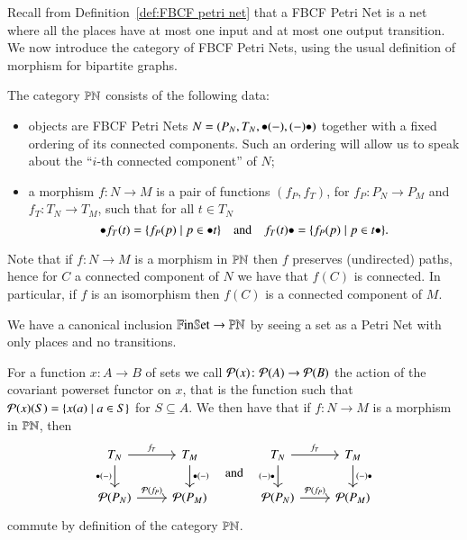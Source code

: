 Recall from Definition~\ref{def:FBCF petri net} that a FBCF Petri Net is a net where all the places have at most one input and at most one output transition. We now introduce the category of FBCF Petri Nets, using the usual definition of morphism for bipartite graphs.

\begin{definition}
    The category $\mathbb{PN}$ consists of the following data:
    \begin{itemize}
        \item objects are FBCF Petri Nets $N=(P_N,T_N,\inp{},\out{})$ together with a fixed ordering of its connected components. Such an ordering will allow us to speak about the ``$i$-th connected component'' of $N$;%
        \item a morphism $f \colon N \to M$ is a pair of functions $(f_P,f_T)$, for $f_P \colon P_N \to P_M$ and $f_T \colon T_N \to T_M$, such that for all $t \in T_N$
        \[
        \inp{f_T(t)} = \{f_P(p) \mid p \in \inp t \} \quad \text{and} \quad \out{f_T(t)} = \{ f_P(p) \mid p \in \out t  \}.
        \]
    \end{itemize}
\end{definition}

Note that if $f \colon N \to M$ is a morphism in $\mathbb{PN}$ then $f$ preserves (undirected) paths, hence for $C$ a connected component of $N$ we have that $f(C)$ is connected. In particular, if $f$ is an isomorphism then $f(C)$ is a connected component of $M$.

\begin{remark}\label{remark:finite sets are in PN}
    We have a canonical inclusion $\mathbb{F}\mathrm{in}\mathbb{S}\mathrm{et} \to \mathbb{PN}$ by seeing a set as a Petri Net with only places and no transitions.	
\end{remark}

For a function $x \colon A \to B$ of sets we call $\mathcal{P}(x) \colon \mathcal{P}(A) \to \mathcal{P}(B)$ the action of the covariant powerset functor on $x$, that is the function such that $\mathcal{P}(x) (S) = \{x(a) \mid a \in S\} $ for $S \subseteq A$. We then have that if $f \colon N \to M$ is a morphism in $\mathbb{PN}$, then
\[
\begin{tikzcd}
T_N \ar[r,"f_T"] \ar[d,"\inp{}"'] & T_M \ar[d,"\inp{}"] \\
\parts{P_N} \ar[r,"\parts{f_P}"] & \parts{P_M}
\end{tikzcd}
\quad \text{and} \quad
\begin{tikzcd}
T_N \ar[r,"f_T"] \ar[d,"\out{}"'] & T_M \ar[d,"\out{}"] \\
\parts{P_N} \ar[r,"\parts{f_P}"] & \parts{P_M}
\end{tikzcd}
\]
commute by definition of the category $\mathbb{PN}$.

